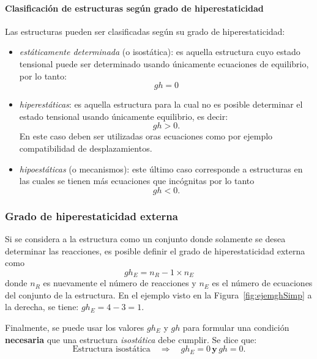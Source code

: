 \paragraph{Clasificación de estructuras según grado de hiperestaticidad} %
Las estructuras pueden ser clasificadas según su grado de hiperestaticidad:
\begin{itemize}
	\item \textit{estáticamente determinada} (o isostática): es aquella estructura cuyo estado tensional puede ser determinado usando únicamente ecuaciones de equilibrio, por lo tanto:
	$$
	gh = 0
	$$
	
	\item \textit{hiperestáticas}: es aquella estructura para la cual no es posible determinar el estado tensional usando únicamente equilibrio, es decir:
	$$
	gh > 0.
	$$
	En este caso deben ser utilizadas oras ecuaciones como por ejemplo compatibilidad de desplazamientos. %
	
	\item \textit{hipoestáticas} (o mecanismos): este último caso corresponde a estructuras en las cuales se tienen más ecuaciones que incógnitas por lo tanto
	$$
	gh <0.
	$$
\end{itemize}



\subsubsection{Grado de hiperestaticidad externa}
%
Si se considera a la estructura como un conjunto donde solamente se desea determinar las reacciones, es posible definir el grado de hiperestaticidad externa como
%
\begin{equation}
gh_E = n_{R} - 1 \times n_{E}
\end{equation}
%
donde $n_R$ es nuevamente el número de reacciones y $n_E$ es el número de ecuaciones del conjunto de la estructura. %
%
En el ejemplo visto en la Figura~\ref{fig:ejemghSimp} a la derecha, se tiene: $gh_E = 4 - 3 = 1$. %



Finalmente, se puede usar los valores $gh_E$ y $gh$ para formular una condición \textbf{necesaria} que una estructura \textit{isostática} debe cumplir. %
%
Se dice que:
%
$$
\boxed{
\text{Estructura isostática} \quad \Rightarrow \quad gh_E = 0 \, \textbf{y} \, gh = 0.
}%
$$


